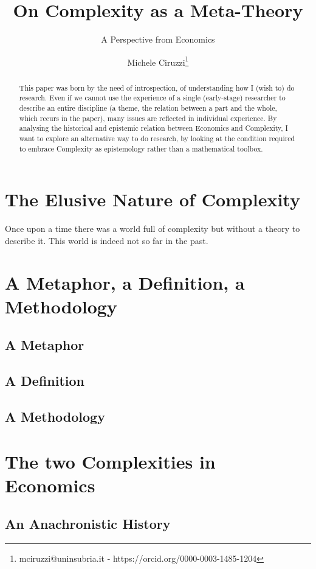 \documentclass[a4paper, headings=standardclasses]{scrartcl}
\title{On Complexity as a Meta-Theory}
\subtitle{A Perspective from Economics}
\author{Michele Ciruzzi\thanks{mciruzzi@uninsubria.it - https://orcid.org/0000-0003-1485-1204}}
\begin{document}
	
	\maketitle
	
	\begin{abstract}
This paper was born by the need of introspection, of understanding how I (wish to) do research. Even if we cannot use the experience of a single (early-stage) researcher to describe an entire discipline (a theme, the relation between a part and the whole, which recurs in the paper), many issues are reflected in individual experience.
By analysing the historical and epistemic relation between Economics and Complexity, I want to explore an alternative way to do research, by looking at the condition required to embrace Complexity as epistemology rather than a mathematical toolbox.
	\end{abstract}
	
	\section{The Elusive Nature of Complexity}
Once upon a time there was a world full of complexity but without a theory to describe it. This world is indeed not so far in the past.


	
	\section{A Metaphor, a Definition, a Methodology}
	\subsection{A Metaphor}
	
	\subsection{A Definition}
	
	\subsection{A Methodology}
	
	\section{The two Complexities in Economics}
	\subsection{An Anachronistic History}
	
\end{document}
